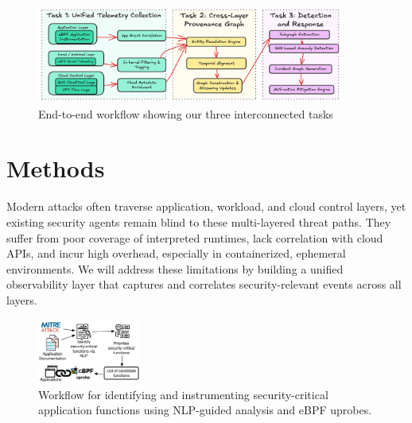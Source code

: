 \begin{figure}[t!]
    \centering \includegraphics[width=0.90\textwidth]{fig/arch.png}
    \caption{End-to-end workflow showing our three interconnected tasks}
    \label{fig:arch}
    \end{figure}



\section*{Methods}

 Modern attacks often traverse application, workload, and cloud control layers, yet existing security agents remain blind to these multi-layered threat paths. They suffer from poor coverage of interpreted runtimes, lack correlation with cloud APIs, and incur high overhead, especially in containerized, ephemeral environments. We will address these limitations by building a unified observability layer that captures and correlates security-relevant events across all layers.

\begin{figure}
    \centering \includegraphics[width=0.30\textwidth]{fig/uprobe-chain.pdf}
    \caption{Workflow for identifying and instrumenting security-critical application functions using NLP-guided analysis and eBPF uprobes.}
    \label{fig:example:uprobe}
    \vspace{-2ex}
\end{figure}

